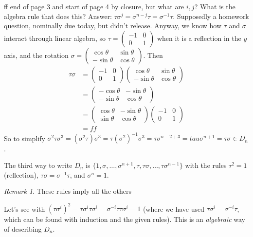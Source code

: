 \documentclass{article}
\theoremstyle{plain}
\theoremstyle{remark}
\newtheorem{remark}{Remark}
\begin{document}
ff end of page 3 and start of page 4
by closure, but what are $i,j$?
What is the algebra rule that does this?
Answer: $\tau\sigma^j = \sigma^{n-j}\tau = \sigma^{-1}\tau$.
Supposedly a homework question, nominally due today, but didn't release.
Anyway, we know how $\tau$ and $\sigma$ interact through linear algebra,
so $\tau = \begin{pmatrix} -1 & 0 \\ 0 & 1\end{pmatrix}$ when
it is a reflection in the $y$ axis,
and the rotation $\sigma =
\begin{pmatrix} \cos\theta & \sin\theta \\ -\sin\theta & \cos\theta \end{pmatrix}$.
Then
\begin{align*}
\tau\sigma &= \begin{pmatrix} -1 & 0 \\ 0 & 1\end{pmatrix}
\begin{pmatrix} \cos\theta & \sin\theta \\ -\sin\theta & \cos\theta \end{pmatrix}\\
&= \begin{pmatrix} -\cos\theta & -\sin\theta \\ -\sin\theta & \cos\theta \end{pmatrix}\\
&= \begin{pmatrix} \cos\theta & -\sin\theta \\ \sin\theta & \cos\theta \end{pmatrix}
\begin{pmatrix} -1 & 0 \\ 0 & 1\end{pmatrix} \\
&= ff
\end{align*}
So to simplify $\sigma^2\tau\sigma^3 = (\sigma^2 \tau) \sigma^3
= \tau(\sigma^2)^{-1}\sigma^3 = \tau \sigma^{n-2+3} = tau\sigma^{n+1}
= \tau\sigma \in D_n$.

The third way to write $D_n$ is
$\{1,\sigma,\dots,\sigma^{n+1},\tau,\tau\sigma,\dots,\tau\sigma^{n-1}\}$
with the rules $\tau^2=1$ (reflection), $\tau\sigma = \sigma^{-1}\tau$,
and $\sigma^n = 1$.
\begin{remark}
These rules imply all the others
\end{remark}
Let's see with $(\tau \sigma^{i})^2 = \tau\sigma^i \tau \sigma^i
= \sigma^{-i}\tau\tau\sigma^i = 1$
(where we have used $\tau\sigma^i = \sigma^{-i}\tau$,
which can be found with induction and the given rules).
This is an {\it algebraic} way of describing $D_n$.
\end{document}
